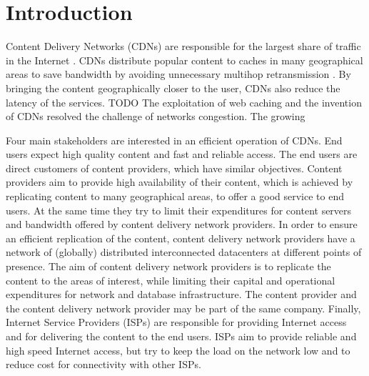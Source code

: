 \chapter{Introduction}\label{chap:introduction}

Content Delivery Networks (CDNs) are responsible for the largest share of traffic in the Internet \cite{cisco2016}.
CDNs distribute popular content to caches in many geographical areas to save bandwidth by avoiding unnecessary multihop retransmission \cite{paschos2016wireless}.
By bringing the content geographically closer to the user, CDNs also reduce the latency of the services.
TODO The exploitation of web caching and the invention of CDNs resolved the challenge of networks congestion.
The growing

Four main stakeholders are interested in an efficient operation of CDNs.
End users expect high quality content and fast and reliable access.
The end users are direct customers of content providers, which have similar objectives.
Content providers aim to provide high availability of their content, which is achieved by replicating content to many geographical areas, to offer a good service to end users.
At the same time they try to limit their expenditures for content servers and bandwidth offered by content delivery network providers.
In order to ensure an efficient replication of the content, content delivery network providers have a network of (globally) distributed interconnected datacenters at different points of presence.
The aim of content delivery network providers is to replicate the content to the areas of interest, while limiting their capital and operational expenditures for network and database infrastructure.
The content provider and the content delivery network provider may be part of the same company.
Finally, Internet Service Providers (ISPs) are responsible for providing Internet access and for delivering the content to the end users.
ISPs aim to provide reliable and high speed Internet access, but try to keep the load on the network low and to reduce cost for connectivity with other ISPs.


